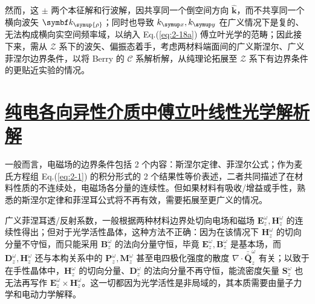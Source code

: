 然而，这 $\pm$ 两个本征解和行波解，因共享同一个倒空间方向 $\hat{\symbf k}$，而不共享同一个横向波矢 $\symbf k_{\symup{\rho}}$；同时也导致 $k_{\symup x}, k_{\symup y}$ 在广义情况下是复的、无法构成横向实空间频率域，以纳入 Eq.(\ref{eq:2-18a}) 傅立叶光学的范畴；因此接下来，需从 $\mathcal{Z}$ 系下的波矢、偏振态着手，考虑两材料端面间的广义斯涅尔、广义菲涅尔边界条件，以将 Berry 的 $\mathcal{C}$ 系解析解，从纯理论拓展至 $\mathcal{Z}$ 系下有边界条件的更贴近实验的情况。

\section{\protect\hyperlink{chap:\thesection}{纯电各向异性介质中傅立叶线性光学解析解}}
\label{纯电各向异性介质中傅立叶线性光学解析解}

一般而言，电磁场的边界条件包括 2 个内容：斯涅尔定律、菲涅尔公式；作为麦氏方程组 Eq.(\ref{eq:2-1}) 的积分形式的 2 个结果性等价表述，二者共同描述了在材料性质的不连续处，电磁场各分量的连续性。但如果材料有吸收/增益\cite{berryOpticalSingularitiesBirefringent2003}或手性，熟悉的斯涅尔定律和菲涅耳公式将不再有效，需要拓展至更广义的情况。

广义菲涅耳透/反射系数，一般根据两种材料边界处切向电场和磁场 $\symbf E^{\omega}_z, \symbf H^{\omega}_z$ 的连续性得出\cite{abdulhalimExactMatrixMethod1999,mcleodVectorFourierOptics2014,wangComplexRayTracing2008a,wangComplexRayTracing2008}；但对于光学活性晶体，这种方法不正确：因为在该情况下 $\symbf H^{\omega}_z$ 的切向分量不守恒，而只能采用 $\symbf B^{\omega}_z$ 的法向分量守恒，毕竟 $\symbf E^{\omega}_z, \symbf B^{\omega}_z$ 是基本场，而 $\symbf D^{\omega}_z, \symbf H^{\omega}_z$ 还与本构关系中的 $\symbf P^{\omega}_z, \symbf M^{\omega}_z$ 甚至电四极化强度的散度 $\nabla \cdot \bar{\bar{\symbf Q}}^{\omega}_z$ 有关\cite{nelsonDerivingTransmissionReflection1995}；以致于在手性晶体中，$\symbf H^{\omega}_z$ 的切向分量、$\symbf D^{\omega}_z$ 的法向分量不再守恒，能流密度矢量 $\symbf S^{\omega}_z$ 也无法再写作 $\symbf E^{\omega}_z \times \symbf H^{\omega}_z$。这一切都因为光学活性是非局域的，其本质需要由量子力学和电动力学解释\cite{eimerlQuantumElectrodynamicsOptical1988,nelsonDerivingTransmissionReflection1995}。

